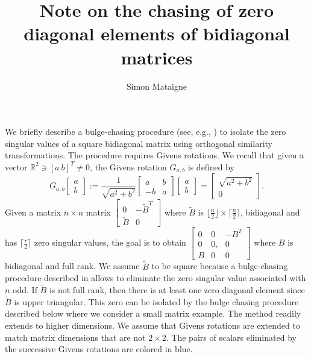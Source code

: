 \documentclass[11pt]{article}
\title{Note on the chasing of zero diagonal elements of bidiagonal matrices}
\author{Simon Mataigne}
\date{}
\begin{document}
\maketitle

	We briefly describe a bulge-chasing procedure (see, e.g., \cite{Vandebril11}) to isolate the zero singular values of a square bidiagonal matrix using orthogonal similarity transformations. The procedure requires Givens rotations. We recall that given a vector $\mathbb{R}^2\ni[a\ b]^T\neq 0$, the Givens rotation $G_{a,b}$ is defined by
	\begin{equation}
	G_{a,b}\begin{bmatrix}
	a\\
	b
	\end{bmatrix}:= \frac{1}{\sqrt{a^2+b^2}}\begin{bmatrix}
	a&b\\
	-b&a
	\end{bmatrix}\begin{bmatrix}
	a\\
	b
	\end{bmatrix} = \begin{bmatrix}
	\sqrt{a^2+b^2}\\
	0
	\end{bmatrix}.
\end{equation}	
Given a matrix $n\times n$ matrix $\left[\begin{smallmatrix}0&-\widetilde{B}^T\\ \widetilde{B}&0\end{smallmatrix}\right]$ where $\widetilde{B}$ is $\lfloor\frac{n}{2}\rfloor\times\lceil\frac{n}{2}\rceil$, bidiagonal and has $\lceil\frac{r}{2}\rceil$ zero singular values, the goal is to obtain $\left[\begin{smallmatrix}0&0&-B^T\\0&0_r&0\\ B&0&0\end{smallmatrix}\right]$ where $B$ is bidiagonal and full rank. We assume $\widetilde{B}$ to be square because a bulge-chasing procedure described in \cite{WardGray78} allows to eliminate the zero singular value associated with $n$ odd. If $\widetilde{B}$ is not full rank, then there is at least one zero diagonal element since $\widetilde{B}$ is upper triangular. This zero can be isolated by the bulge chasing procedure described below where we consider a small matrix example. The method readily extends to higher dimensions. We assume that Givens rotations are extended to match matrix dimensions that are not $2\times 2$. The pairs of scalars eliminated by the successive Givens rotations are colored in blue.
\end{document}
